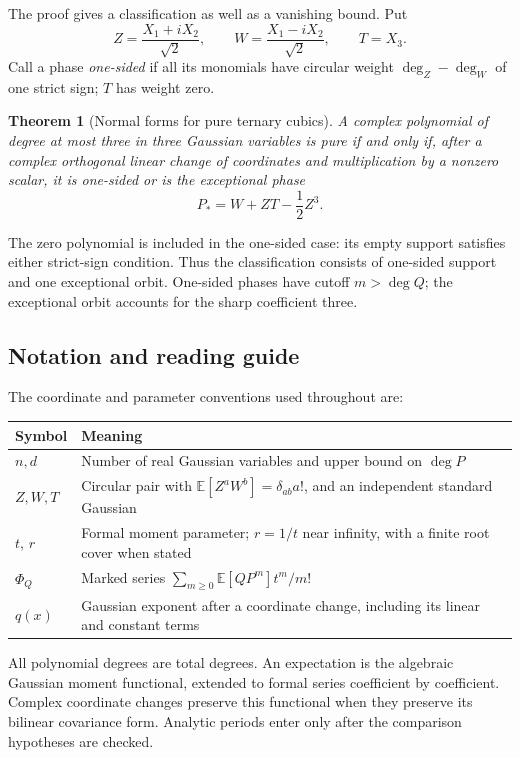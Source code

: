 \documentclass[11pt]{article}
\newtheorem{theorem}{Theorem}[section]
\theoremstyle{definition}\newtheorem{definition}[theorem]{Definition}
\theoremstyle{remark}\newtheorem{remark}[theorem]{Remark}
\newcommand{\E}{\mathbb E}
\begin{document}
The proof gives a classification as well as a vanishing bound. Put
\begin{equation}\label{eq:circularcoords}
 Z=\frac{X_1+iX_2}{\sqrt2},\qquad
 W=\frac{X_1-iX_2}{\sqrt2},\qquad T=X_3.
\end{equation}
Call a phase \emph{one-sided} if all its monomials have circular
weight $\deg_Z-\deg_W$ of one strict sign; $T$ has weight zero.

\begin{theorem}[Normal forms for pure ternary cubics]
\label{thm:normalforms}
A complex polynomial of degree at most three in three Gaussian
variables is pure if and only if, after a complex orthogonal linear
change of coordinates and multiplication by a nonzero scalar, it is
one-sided or is the exceptional phase
\[
 P_*=W+ZT-\frac12 Z^3.
\]
\end{theorem}

The zero polynomial is included in the one-sided case: its empty support
satisfies either strict-sign condition. Thus the classification consists
of one-sided support and one exceptional orbit. One-sided phases have cutoff $m>\deg Q$; the
exceptional orbit accounts for the sharp coefficient three.

\subsection*{Notation and reading guide}
The coordinate and parameter conventions used throughout are:
\begin{center}\small
\begin{tabular}{@{}p{}p{}@{}}
\toprule
Symbol & Meaning\\
\midrule
$n,d$ & Number of real Gaussian variables and upper bound on $\deg P$\\[3pt]
$Z,W,T$ & Circular pair with $\E[Z^aW^b]=\delta_{ab}a!$, and an independent standard Gaussian\\[3pt]
$t$, $r$ & Formal moment parameter; $r=1/t$ near infinity, with a finite root cover when stated\\[3pt]
$\Phi_Q$ & Marked series $\sum_{m\ge0}\E[QP^m]t^m/m!$\\[3pt]
$q(x)$ & Gaussian exponent after a coordinate change, including its linear and constant terms\\
\bottomrule
\end{tabular}
\end{center}
All polynomial degrees are total degrees. An expectation is the algebraic
Gaussian moment functional, extended to formal series coefficient by
coefficient. Complex coordinate changes preserve this functional when
they preserve its bilinear covariance form. Analytic periods enter only
after the comparison hypotheses are checked.
\end{document}
